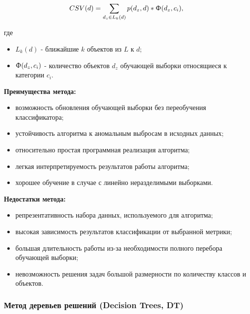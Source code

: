 \documentclass[utf8x, 14pt, oneside, a4paper]{article}
\begin{document}
	\begin{equation}
		CSV(d) = \sum_{d_z\in L_k(d)} p(d_z, d) * \Upphi(d_z, c_i),
	\end{equation}

	где
	
	\begin{itemize}
		\item $L_k(d)$ - ближайшие $k$ объектов из $L$ к $d$;
		\item $\Upphi(d_z, c_i)$ - количество объектов $d_z$ обучающей выборки относящиеся к категории $c_i$.
	\end{itemize}

	\begin{flushleft}
		{\bf Преимущества метода:}
	\end{flushleft}

	\begin{itemize}
		\item возможность обновления обучающей выборки без переобучения классификатора; 
		\item устойчивость алгоритма к аномальным выбросам в исходных данных; 
		\item относительно простая программная реализация алгоритма;
		\item легкая интерпретируемость результатов работы алгоритма;
		\item хорошее обучение в случае с линейно неразделимыми выборками.
	\end{itemize}
	
	\begin{flushleft}
		{\bf Недостатки метода:}
	\end{flushleft}

	\begin{itemize}
		\item репрезентативность набора данных, используемого для алгоритма;
		\item высокая зависимость результатов классификации от выбранной метрики;
		\item большая длительность работы из-за необходимости полного  перебора обучающей выборки; 
		\item невозможность решения задач большой размерности по количеству классов и объектов. 
	\end{itemize}
	
	\subsubsection{Метод деревьев решений (Decision Trees, DT)}
	
\end{document}
